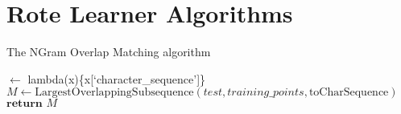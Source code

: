 \chapter{Rote Learner Algorithms}


\begin{algorithm}
    \caption{The NGram Overlap Matching algorithm }
    \label{alg:ngram_overlap}
    \begin{algorithmic}
       

        \State {} $\gets$ lambda(x)\{x[`character\_sequence']\}
        \State $M \gets \text{LargestOverlappingSubsequence}(test, training\_points, \text{toCharSequence})$
        \State $\textbf{return } M$

        \EndProcedure

    \end{algorithmic}
\hrulefill

    \begin{algorithmic}
        

\end{algorithmic}
\end{algorithm}
